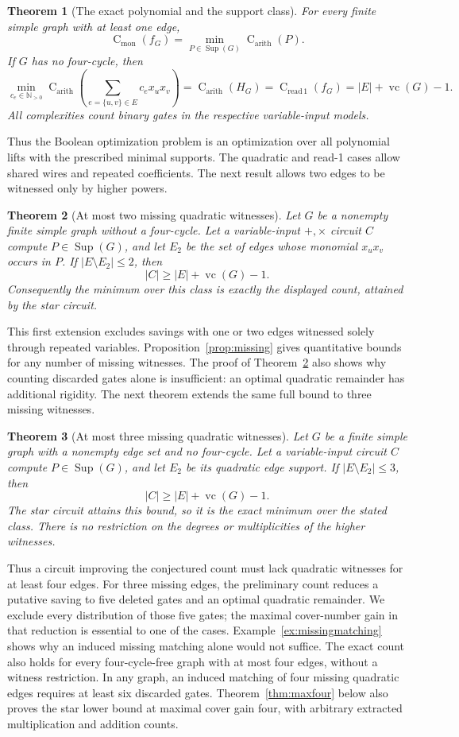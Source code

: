 \documentclass[11pt]{article}
\newcommand{\N}{\mathbb N}
\newcommand{\Sup}{\operatorname{Sup}}
\newcommand{\vc}{\operatorname{vc}}
\newcommand{\cmon}{\operatorname{C}_{\mathrm{mon}}}
\newcommand{\car}{\operatorname{C}_{\mathrm{arith}}}
\newcommand{\cread}{\operatorname{C}_{\mathrm{read}\,1}}
\newtheorem{theorem}{Theorem}[section]
\theoremstyle{definition}
\theoremstyle{remark}
\begin{document}
\begin{theorem}[The exact polynomial and the support class]\label{thm:main}
For every finite simple graph with at least one edge,
\[
 \cmon(f_G)=\min_{P\in\Sup(G)}\car(P).
\]
If $G$ has no four-cycle, then
\[
 \min_{c_e\in\N_{>0}}\car\!\left(\sum_{e=\{u,v\}\in E}c_ex_ux_v\right)
 =\car(H_G)=\cread(f_G)=|E|+\vc(G)-1.
\]
All complexities count binary gates in the respective variable-input models.
\end{theorem}
Thus the Boolean optimization problem is an optimization over all polynomial lifts with the prescribed minimal supports. The quadratic and read-1 cases allow shared wires and repeated coefficients. The next result allows two edges to be witnessed only by higher powers.

\begin{theorem}[At most two missing quadratic witnesses]\label{thm:twomissing}
Let $G$ be a nonempty finite simple graph without a four-cycle. Let a variable-input $+,\times$ circuit $C$ compute $P\in\Sup(G)$, and let $E_2$ be the set of edges whose monomial $x_ux_v$ occurs in $P$. If $|E\setminus E_2|\le2$, then
\[
 |C|\ge |E|+\vc(G)-1.
\]
Consequently the minimum over this class is exactly the displayed count, attained by the star circuit.
\end{theorem}
This first extension excludes savings with one or two edges witnessed solely through repeated variables. Proposition~\ref{prop:missing} gives quantitative bounds for any number of missing witnesses. The proof of Theorem~\ref{thm:twomissing} also shows why counting discarded gates alone is insufficient: an optimal quadratic remainder has additional rigidity. The next theorem extends the same full bound to three missing witnesses.

\begin{theorem}[At most three missing quadratic witnesses]\label{thm:threemissing}
Let $G$ be a finite simple graph with a nonempty edge set and no four-cycle. Let a variable-input circuit $C$ compute $P\in\Sup(G)$, and let $E_2$ be its quadratic edge support. If $|E\setminus E_2|\le3$, then
\[
 |C|\ge |E|+\vc(G)-1.
\]
The star circuit attains this bound, so it is the exact minimum over the stated class. There is no restriction on the degrees or multiplicities of the higher witnesses.
\end{theorem}
Thus a circuit improving the conjectured count must lack quadratic witnesses for at least four edges. For three missing edges, the preliminary count reduces a putative saving to five deleted gates and an optimal quadratic remainder. We exclude every distribution of those five gates; the maximal cover-number gain in that reduction is essential to one of the cases. Example~\ref{ex:missingmatching} shows why an induced missing matching alone would not suffice. The exact count also holds for every four-cycle-free graph with at most four edges, without a witness restriction. In any graph, an induced matching of four missing quadratic edges requires at least six discarded gates. Theorem~\ref{thm:maxfour} below also proves the star lower bound at maximal cover gain four, with arbitrary extracted multiplication and addition counts.
\end{document}
